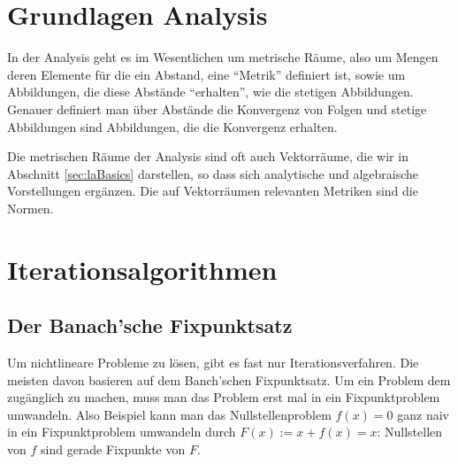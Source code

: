 \documentclass[index=totoc]{scrartcl}%
\theoremstyle{definition}
\begin{document}
\newpage

\section{Grundlagen Analysis}
\label{sec:anaBasics}

In der Analysis geht es im Wesentlichen um metrische Räume,
also um Mengen deren Elemente für die ein Abstand,
eine "`Metrik"' definiert ist,
sowie um Abbildungen, die diese Abstände "`erhalten"',
wie die stetigen Abbildungen.
Genauer definiert man über Abstände die Konvergenz von Folgen
und stetige Abbildungen sind Abbildungen, die die Konvergenz erhalten. 

Die metrischen Räume der Analysis sind oft auch Vektorräume, 
die wir in Abschnitt \ref{sec:laBasics} darstellen, 
so dass sich analytische und algebraische Vorstellungen ergänzen. 
Die auf Vektorräumen relevanten Metriken sind die Normen.





\section{Iterationsalgorithmen}\label{sec:iter}


\subsection{Der Banach'sche Fixpunktsatz }

Um nichtlineare Probleme zu lösen, gibt es fast nur Iterationsverfahren.
Die meisten davon basieren auf dem Banch'schen Fixpunktsatz.
Um ein Problem dem zugänglich zu machen,
muss man das Problem erst mal in ein Fixpunktproblem umwandeln.
Also Beispiel kann man das Nullstellenproblem $f(x)=0$
ganz naiv in ein Fixpunktproblem umwandeln durch
$F(x):=x+f(x)=x$: Nullstellen von $f$ sind gerade Fixpunkte von $F$. 
\end{document}
